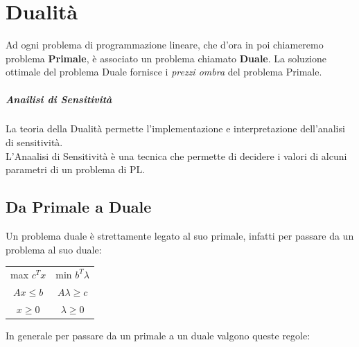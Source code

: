 \documentclass[12pt, a4paper, openany]{book}
\begin{document}
\chapter{Dualità}
Ad ogni problema di programmazione lineare, che d'ora in poi chiameremo problema \textbf{Primale},
è associato un problema chiamato \textbf{Duale}.
La soluzione ottimale del problema Duale fornisce i \emph{prezzi ombra} del problema Primale.

\paragraph{Anailisi di Sensitività} La teoria della Dualità permette l'implementazione e interpretazione dell'analisi di sensitività.
\\L'Anaalisi di Sensitività è una tecnica che permette di decidere i valori di alcuni parametri di un problema di PL.

\section{Da Primale a Duale}
Un problema duale è strettamente legato al suo primale, infatti per passare da un problema al suo duale:

\begin{center}
    \begin{tabular}{ |c|c| }
        \hline
        max $c^T x $ & min $b^T \lambda $  \\
        $A x \leq b$ & $ A \lambda \geq c$ \\
        $x \geq 0$   & $ \lambda \geq 0 $ \\
        \hline
    \end{tabular}
\end{center}

In generale per passare da un primale a un duale valgono queste regole:
\end{document}
